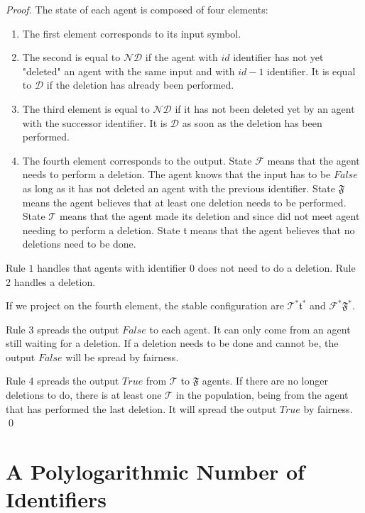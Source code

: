 \documentclass[UKenglish]{llncs}
\newcommand\f{\mathfrak{F}}
\newcommand\ttt{\mathfrak{t}}
\newcommand\III{\mathcal{ND}}
\newcommand\D{\mathcal{D}}
\newcommand\F{\mathcal{F}}
\newcommand\T{\mathcal{T}}
\begin{document}
\begin{proof}
The state of each agent is composed of four elements:
\begin{enumerate}
\item The first element corresponds to its input symbol.
\item The second is equal to $\III$ if the agent with $id$ identifier has not yet "deleted" an
agent with the same input and with $id-1$ identifier. It is equal to $\D$
if the deletion has already been performed.
\item The third element is equal to $\III$ if it has not been deleted yet by an agent
with the successor identifier. It is $\D$ as soon as the deletion has been performed.
\item The fourth element corresponds to the output. State $\F$ means that
the agent needs to perform a deletion. The agent knows that the input has to be $False$
as long as it has not deleted an agent with the previous identifier. State $\f$ means
the agent believes that at least one deletion needs to be performed.
State $\T$ means that the agent made its deletion and since did not meet agent needing
to perform a deletion. State $\ttt$ means that the agent believes that no deletions need to be done.
\end{enumerate}

Rule $1$ handles that agents with identifier $0$ does not need to do a deletion.
Rule 2 handles a deletion.

If we project on the fourth element, the stable configuration are
$\T^*\ttt^*$ and $\F^*\f^*$.

Rule 3 spreads the output $False$ to each agent. It can only come
from an agent still waiting for a deletion. If a deletion needs to be done
and cannot be, the output $False$ will be spread by fairness.

Rule 4 spreads the output $True$ from $\T$ to $\f$ agents.
If there are no longer deletions to do, there is at least one $\T$ in the population,
being from the agent that has performed the last deletion.
It will spread the output $True$ by fairness. \hfill \qed
\end{proof}







 




\section{A Polylogarithmic Number of Identifiers}\label{sec:3p}
\end{document}
